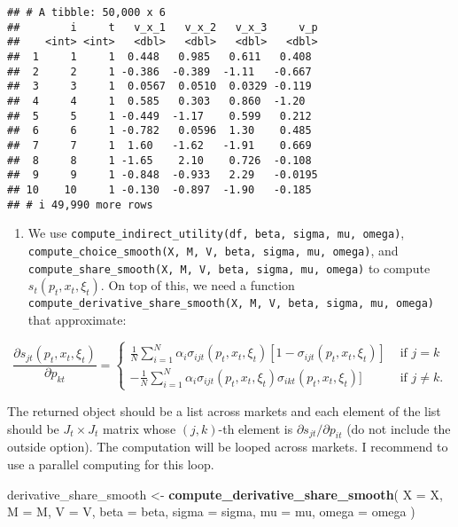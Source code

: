 \documentclass[
]{book}
\newenvironment{Shaded}{\begin{snugshade}}{\end{snugshade}}
\newcommand{\AttributeTok}[1]{\textcolor[rgb]{0.13,0.29,0.53}{#1}}
\newcommand{\FunctionTok}[1]{\textcolor[rgb]{0.13,0.29,0.53}{\textbf{#1}}}
\newcommand{\NormalTok}[1]{#1}
\newcommand{\OtherTok}[1]{\textcolor[rgb]{0.56,0.35,0.01}{#1}}
\providecommand{\tightlist}{%
  \setlength{\itemsep}{0pt}\setlength{\parskip}{0pt}}
\begin{document}
\begin{verbatim}
## # A tibble: 50,000 x 6
##        i     t   v_x_1   v_x_2   v_x_3     v_p
##    <int> <int>   <dbl>   <dbl>   <dbl>   <dbl>
##  1     1     1  0.448   0.985   0.611   0.408 
##  2     2     1 -0.386  -0.389  -1.11   -0.667 
##  3     3     1  0.0567  0.0510  0.0329 -0.119 
##  4     4     1  0.585   0.303   0.860  -1.20  
##  5     5     1 -0.449  -1.17    0.599   0.212 
##  6     6     1 -0.782   0.0596  1.30    0.485 
##  7     7     1  1.60   -1.62   -1.91    0.669 
##  8     8     1 -1.65    2.10    0.726  -0.108 
##  9     9     1 -0.848  -0.933   2.29   -0.0195
## 10    10     1 -0.130  -0.897  -1.90   -0.185 
## # i 49,990 more rows
\end{verbatim}

\begin{enumerate}
\def\labelenumi{\arabic{enumi}.}
\setcounter{enumi}{4}
\tightlist
\item
  We use \texttt{compute\_indirect\_utility(df,\ beta,\ sigma,\ mu,\ omega)}, \texttt{compute\_choice\_smooth(X,\ M,\ V,\ beta,\ sigma,\ mu,\ omega)}, and \texttt{compute\_share\_smooth(X,\ M,\ V,\ beta,\ sigma,\ mu,\ omega)} to compute \(s_t(p_t, x_t, \xi_t)\). On top of this, we need a function \texttt{compute\_derivative\_share\_smooth(X,\ M,\ V,\ beta,\ sigma,\ mu,\ omega)} that approximate:
\end{enumerate}

\[
\frac{\partial s_{jt}(p_t, x_t, \xi_t)}{\partial p_{kt}} = 
\begin{cases}
\frac{1}{N} \sum_{i = 1}^N \alpha_i \sigma_{ijt}(p_t, x_t, \xi_t)[1 - \sigma_{ijt}(p_t, x_t, \xi_t)] &\text{   if   } j = k\\
- \frac{1}{N}\sum_{i = 1}^N \alpha_i \sigma_{ijt}(p_t, x_t, \xi_t)\sigma_{ikt}(p_t, x_t, \xi_t)] &\text{   if   } j \neq k.
\end{cases}
\]

The returned object should be a list across markets and each element of the list should be \(J_t \times J_t\) matrix whose \((j, k)\)-th element is \(\partial s_{jt}/\partial p_{it}\) (do not include the outside option). The computation will be looped across markets. I recommend to use a parallel computing for this loop.

\begin{Shaded}
\begin{Highlighting}[]
\NormalTok{derivative\_share\_smooth }\OtherTok{\textless{}{-}}
  \FunctionTok{compute\_derivative\_share\_smooth}\NormalTok{(}
    \AttributeTok{X =}\NormalTok{ X,}
    \AttributeTok{M =}\NormalTok{ M, }
    \AttributeTok{V =}\NormalTok{ V, }
    \AttributeTok{beta =}\NormalTok{ beta, }
    \AttributeTok{sigma =}\NormalTok{ sigma, }
    \AttributeTok{mu =}\NormalTok{ mu, }
    \AttributeTok{omega =}\NormalTok{ omega}
\NormalTok{    )}
\end{Highlighting}
\end{Shaded}
\end{document}
